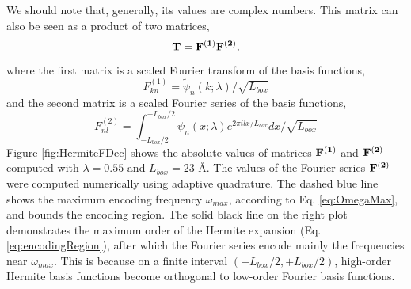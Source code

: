 We should note that, generally, its values are complex numbers.
%
This matrix can also be seen as a product of two matrices,
\begin{equation}
\bf T = \bf F^{(1)} \bf F^{(2)},
\label{eq:TmatrixProduct}
\end{equation}
where the first matrix is a scaled Fourier transform of the basis functions,
\begin{equation}
 F^{(1)}_{kn} =  \tilde{\psi}_{n}(k; \lambda) / \sqrt{L_{box}}
\label{eq:F1matrix}
\end{equation}
and the second matrix is  a scaled Fourier series of the basis functions,
\begin{equation}
F^{(2)}_{nl} = \int_{-L_{box}/2}^{+L_{box}/2} \psi_{n}(x; \lambda) e^{2\pi i l x/L_{box}} dx / \sqrt{L_{box}}
\label{eq:F2matrix}
\end{equation}
%
Figure \ref{fig:HermiteFDec} shows the absolute values of matrices $ \bf F^{(1)} $ and $\bf F^{(2)}$ computed with $\lambda=0.55$ and $L_{box}=23$ \AA. 
%
The values of the  Fourier series  $\bf F^{(2)}$ were computed numerically using adaptive  quadrature.
%
The dashed blue line shows the maximum encoding frequency $\omega_{max}$, according to Eq. \ref{eq:OmegaMax}, and bounds the encoding region. 
The solid black line on the right plot demonstrates the maximum order of the Hermite expansion (Eq. \ref{eq:encodingRegion}), after which the 
Fourier series encode mainly the frequencies near $\omega_{max}$.  This is because on a finite interval $(-L_{box}/2 ,+L_{box}/2)$, 
high-order Hermite basis functions become orthogonal to low-order Fourier basis functions. 
%

